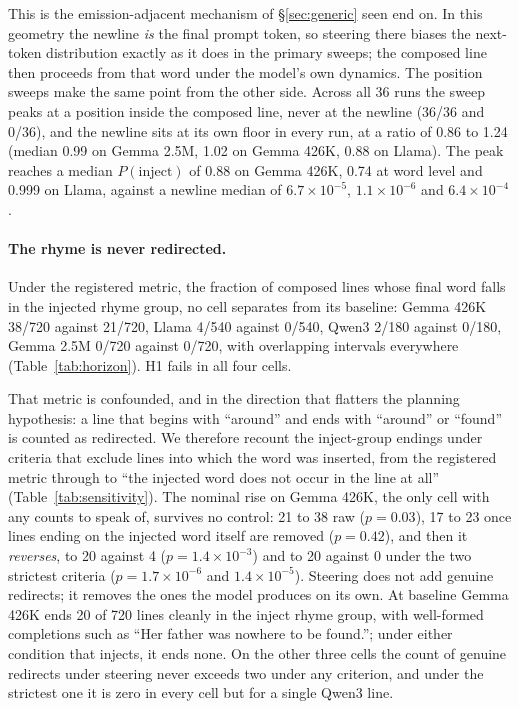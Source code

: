 \documentclass[11pt]{article}
\begin{document}
This is the emission-adjacent mechanism of \S\ref{sec:generic} seen end on. In this geometry the newline \emph{is} the final prompt token, so steering there biases the next-token distribution exactly as it does in the primary sweeps; the composed line then proceeds from that word under the model's own dynamics. The position sweeps make the same point from the other side. Across all 36 runs the sweep peaks at a position inside the composed line, never at the newline (36/36 and 0/36), and the newline sits at its own floor in every run, at a ratio of 0.86 to 1.24 (median 0.99 on Gemma 2.5M, 1.02 on Gemma 426K, 0.88 on Llama). The peak reaches a median $P(\text{inject})$ of 0.88 on Gemma 426K, 0.74 at word level and 0.999 on Llama, against a newline median of $6.7\times10^{-5}$, $1.1\times10^{-6}$ and $6.4\times10^{-4}$.

\paragraph{The rhyme is never redirected.}
Under the registered metric, the fraction of composed lines whose final word falls in the injected rhyme group, no cell separates from its baseline: Gemma 426K 38/720 against 21/720, Llama 4/540 against 0/540, Qwen3 2/180 against 0/180, Gemma 2.5M 0/720 against 0/720, with overlapping intervals everywhere (Table~\ref{tab:horizon}). H1 fails in all four cells.

That metric is confounded, and in the direction that flatters the planning hypothesis: a line that begins with ``around'' and ends with ``around'' or ``found'' is counted as redirected. We therefore recount the inject-group endings under criteria that exclude lines into which the word was inserted, from the registered metric through to ``the injected word does not occur in the line at all'' (Table~\ref{tab:sensitivity}). The nominal rise on Gemma 426K, the only cell with any counts to speak of, survives no control: 21 to 38 raw ($p=0.03$), 17 to 23 once lines ending on the injected word itself are removed ($p=0.42$), and then it \emph{reverses}, to 20 against 4 ($p=1.4\times10^{-3}$) and to 20 against 0 under the two strictest criteria ($p=1.7\times10^{-6}$ and $1.4\times10^{-5}$). Steering does not add genuine redirects; it removes the ones the model produces on its own. At baseline Gemma 426K ends 20 of 720 lines cleanly in the inject rhyme group, with well-formed completions such as ``Her father was nowhere to be found.''; under either condition that injects, it ends none. On the other three cells the count of genuine redirects under steering never exceeds two under any criterion, and under the strictest one it is zero in every cell but for a single Qwen3 line.
\end{document}
